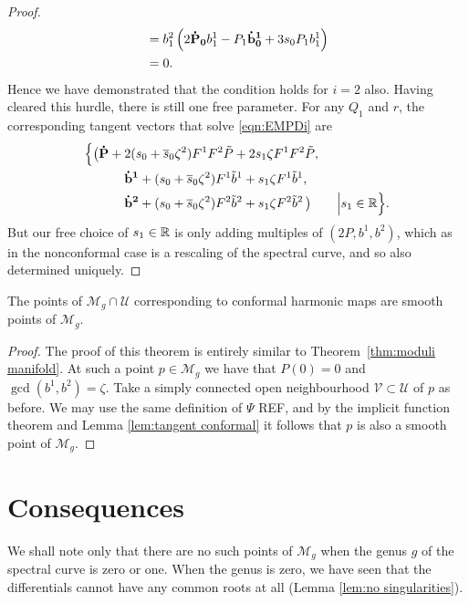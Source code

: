 \documentclass{article}
\begin{document}
\begin{lem}[Case (v)]
\begin{proof}
\begin{align*}
&= b^2_1\left(2 \mathbf{\dot{P}_0} b^1_1 - P_1 \mathbf{\dot{b}^1_0} + 3 s_0 P_1 b^1_1 \right) \\
&= 0.
\end{align*}
Hence we have demonstrated that the condition holds for $i=2$ also. Having cleared this hurdle, there is still one free parameter. For any $Q_1$ and $r$, the corresponding tangent vectors that solve \eqref{eqn:EMPDi} are
\begin{align*}
\Big\{
\big(&\mathbf{\dot P} + 2(s_0+\overline{s}_0\zeta^2) F^1F^2\tilde{P} + 2s_1\zeta F^1F^2\tilde{P}, \\
&\qquad\mathbf{\dot b^1} + (s_0+\overline{s}_0\zeta^2) F^1\tilde{b}^1 + s_1\zeta F^1\tilde{b}^1, \\
&\qquad\mathbf{\dot b^2} + (s_0+\overline{s}_0\zeta^2) F^2\tilde{b}^2 + s_1\zeta F^2\tilde{b}^2 \,\big)
\qquad\Big\vert s_1 \in \mathbb{R}
\Big\}.
\end{align*}
But our free choice of $s_1\in\mathbb{R}$ is only adding multiples of $(2P,b^1,b^2)$, which as in the nonconformal case is a rescaling of the spectral curve, and so also determined uniquely.
\end{proof}
\end{lem}





\begin{thm}
\label{thm:conformal moduli manifold}
The points of $\mathcal{M}_g \cap \mathcal{U}$ corresponding to conformal harmonic maps are smooth points of $\mathcal{M}_g$.

\begin{proof}
The proof of this theorem is entirely similar to Theorem~\ref{thm:moduli manifold}. At such a point $p\in\mathcal{M}_g$ we have that $P(0) = 0$ and $\gcd(b^1,b^2)=\zeta$. Take a simply connected open neighbourhood $\mathcal{V}\subset \mathcal{U}$ of $p$ as before. We may use the same definition of $\Psi$ REF, and by the implicit function theorem and Lemma \ref{lem:tangent conformal} it follows that $p$ is also a smooth point of $\mathcal{M}_g$.
\end{proof}
\end{thm}


\section{Consequences}
We shall note only that there are no such points of $\mathcal{M}_g$ when the genus $g$ of the spectral curve is zero or one.
When the genus is zero, we have seen that the differentials cannot have any common roots at all (Lemma \ref{lem:no singularities}).
\end{document}
